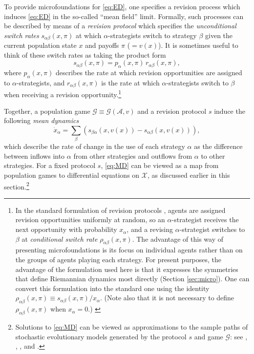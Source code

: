 \documentclass[reqno]{amsart}
\theoremstyle{plain}
\theoremstyle{definition}
\theoremstyle{remark}
\numberwithin{equation}{section}
\numberwithin{theorem}{section}
\begin{document}
To provide microfoundations for \eqref{eq:ED}, one specifies a revision process which induces \eqref{eq:ED} in the so-called ``mean field'' limit.
Formally, such processes can be described by means of a \emph{revision protocol} which specifies the \emph{unconditional switch rates} ${s}_{\alpha\beta}(x,\pi)$ at which $\alpha$-strategists switch to strategy $\beta$ given the current population state $x$ and payoffs $\pi$ ($={v}(x)$). 
It is sometimes useful to think of these switch rates as taking the product form
\begin{equation}
\label{eq:PProd}
{s}_{\alpha\beta}(x,\pi)
	= p_{\alpha}(x,\pi) \,r_{\alpha\beta}(x,\pi),
\end{equation}
where $p_{\alpha}(x,\pi)$ describes the rate at which revision opportunities are assigned to $\alpha$-strategists,
and $r_{\alpha\beta}(x,\pi)$ is the rate at which $\alpha$-strategists switch to $\beta$ when receiving a revision opportunity.\footnote{In the standard formulation of revision protocols \citep{San10,San10b}, agents are assigned revision opportunities uniformly at random, so an $\alpha$-strategist receives the next opportunity with probability $x_\alpha$,
and a revising $\alpha$-strategist switches to $\beta$ at \emph{conditional switch rate} $\rho_{\alpha\beta}(x,\pi)$.
The advantage of this way of presenting microfoundations is its focus on individual agents rather than on the groups of agents playing each strategy.
For present purposes, the advantage of the formulation used here is that it expresses the symmetries that define Riemannian dynamics most directly (Section \ref{sec:micro}).
One can convert this formulation into the standard one using the identity $\rho_{\alpha\beta}(x, \pi) \equiv {s}_{\alpha\beta}(x, \pi)/x_\alpha$.
(Note also that it is not necessary to define $\rho_{\alpha\beta}(x, \pi)$ when $x_\alpha=0$.)
\label{fn:Micro}}

Together, a population game ${\mathcal{G}}\equiv{\mathcal{G}}({\mathcal{A}},{v})$ and a revision protocol $s$ induce the following \emph{mean dynamics}
\begin{equation}
\label{eq:MD}
\tag{MD}
\dot x_{\alpha}
	= {\sum\nolimits}_{\beta}\left({s}_{\beta\alpha}(x, {v}(x))-{s}_{\alpha\beta}(x, {v}(x))\right),
\end{equation}
which describe the rate of change in the use of each strategy $\alpha$ as the difference between inflows into $\alpha$ from other strategies and outflows from $\alpha$ to other strategies.
For a fixed protocol $s$, \eqref{eq:MD} can be viewed as a map from population games to differential equations on ${\mathcal{X}}$, as discussed earlier in this section.\footnote{Solutions to \eqref{eq:MD} can be viewed as approximations to the sample paths of stochastic evolutionary models generated by the protocol $s$ and game ${\mathcal{G}}$: see \cite{Kur70}, \cite{Ben98}, \cite{BW03}, and \cite{RS13}.}
\end{document}
